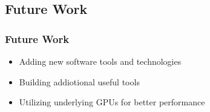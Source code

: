     \subsection{Future Work}
        \begin{frame}
            \frametitle{Future Work}
            \begin{itemize}
                \item Adding new software tools and technologies
                \item Building addiotional useful tools
                \item Utilizing underlying GPUs for better performance
            \end{itemize}
        \end{frame}